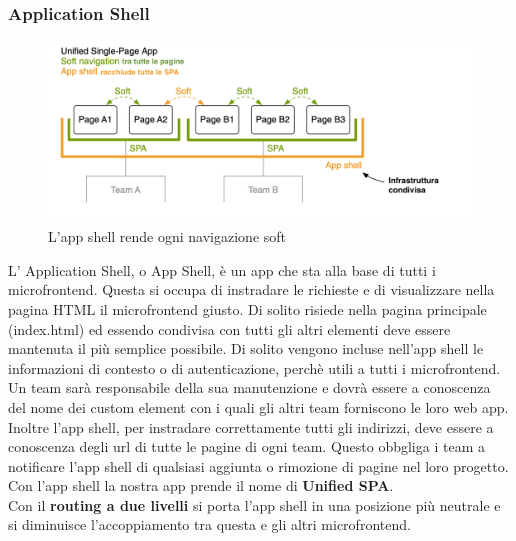 \subsubsection{Application Shell}
\begin{figure}[H]
    \centering
    \includegraphics[width=148mm]{img/appshell}
    \caption{L'app shell rende ogni navigazione soft}
  \end{figure}
L' Application Shell, o App Shell, è un app che sta alla base di tutti i microfrontend. Questa si occupa di instradare le
richieste e di visualizzare nella pagina HTML il microfrontend giusto. Di solito risiede nella pagina principale (index.html) ed essendo
condivisa con tutti gli altri elementi deve essere mantenuta il più semplice possibile.
Di solito vengono incluse nell'app shell le informazioni di contesto o di autenticazione, perchè utili a tutti i microfrontend.
\\
Un team sarà responsabile della sua manutenzione e dovrà essere a conoscenza del nome dei custom element con i quali gli altri team forniscono
le loro web app.
Inoltre l'app shell, per instradare correttamente tutti gli indirizzi, deve essere a conoscenza degli url di tutte le pagine di ogni team.
Questo obbgliga i team a notificare l'app shell di qualsiasi aggiunta o rimozione di pagine nel loro progetto.
Con l'app shell la nostra app prende il nome di \textbf{Unified SPA}.
\\Con il \textbf{routing a due livelli} si porta l'app shell in una posizione più neutrale e si diminuisce l'accoppiamento tra questa e gli altri microfrontend.
